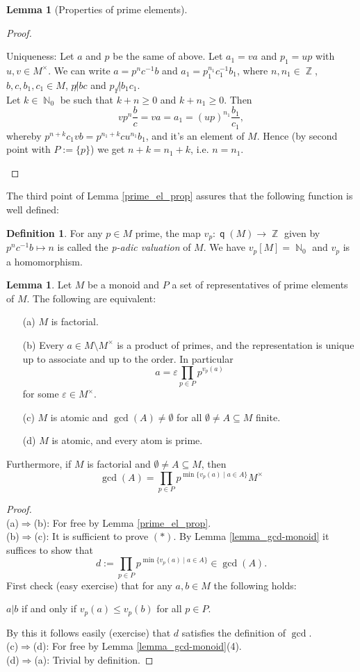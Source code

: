 \documentclass[12pt,a4paper]{report}
\theoremstyle{definition}
\newtheorem{lemma}[theorem]{Lemma}
\newtheorem{defn}[theorem]{Definition}
\theoremstyle{num.custom-title}
\DeclareMathOperator{\N}{\mathbb{N}}
\DeclareMathOperator{\Z}{\mathbb{Z}}
\DeclareMathOperator{\imp}{\Rightarrow}
\DeclareMathOperator{\sm}{\setminus}
\DeclareMathOperator{\sse}{\subseteq}
\DeclareMathOperator{\q}{\mathsf{q}}
\renewcommand{\epsilon}{\varepsilon}
\begin{document}
\begin{lemma}[Properties of prime elements]
\begin{proof}
\begin{enumerate}
Uniqueness: Let $a$ and $p$ be the same of above. Let $a_1 = va$ and $p_1=up$ with $u,v \in M^\times$. We can write $a=p^nc^{-1}b$ and $a_1 = p_1^{n_1} c_1^{-1} b_1$, where $n,n_1 \in \Z$, $b,c,b_1,c_1 \in M$, $p \not| bc$ and $p_1 \not| b_1c_1$.\\
Let $k \in \N_0$ be such that $k+n \geq 0$ and $k+n_1 \geq 0$. Then 
\[
vp^n \frac{b}{c} = va = a_1 = (up)^{n_1} \frac{b_1}{c_1},
\]
whereby $p^{n+k} c_1 v b = p^{n_1+k} c u^{n_1} b_1$, and it's an element of $M$. Hence (by second point with $P:=\{p\}$) we get $n+k=n_1+k$, i.e. $n=n_1$.
\end{enumerate}
\end{proof}
\end{lemma}

The third point of Lemma \ref{prime_el_prop} assures that the following function is well defined:

\begin{defn}
For any $p \in M$ prime, the map $v_p : \q(M) \to \Z$ given by $p^n c^{-1} b \mapsto n$ is called the \emph{p-adic valuation} of $M$. We have $v_p[M]=\N_0$ and $v_p$ is a homomorphism.
\end{defn}

\begin{lemma}\label{char_fact_monoids}
Let $M$ be a monoid and $P$ a set of representatives of prime elements of $M$. The following are equivalent:
\begin{enumerate}
\item[(a)] $M$ is factorial.
\item[(b)] Every $a \in M \sm M^\times$ is a product of primes, and the representation is unique up to associate and up to the order. In particular
\[
a = \epsilon \prod_{p \in P} p^{v_p(a)}
\]
for some $\epsilon \in M^\times$.
\item[(c)] $M$ is atomic and $\gcd(A) \neq \emptyset$ for all $\emptyset \neq A \sse M$ finite.
\item[(d)] $M$ is atomic, and every atom is prime.
\end{enumerate}
Furthermore, if $M$ is factorial and $\emptyset \neq A \sse M$, then
\[
\gcd(A) = \prod_{p \in P} p^{\min\{v_p(a) \mid a \in A\}} M^\times \tag{$*$}
\]
\begin{proof}\ \\
(a)$\imp$(b): For free by Lemma \ref{prime_el_prop}.\\
(b)$\imp$(c): It is sufficient to prove $(*)$. By Lemma \ref{lemma_gcd-monoid} it suffices to show that
\[
d := \prod_{p \in P} p^{\min\{v_p(a) \mid a \in A\}} \in \gcd(A).
\]
First check (easy exercise) that for any $a,b \in M$ the following holds:
\begin{center}
$a|b$ if and only if $v_p(a) \leq v_p(b)$ for all $p \in P$.
\end{center}
By this it follows easily (exercise) that $d$ satisfies the definition of $\gcd$.\\
(c)$\imp$(d): For free by Lemma \ref{lemma_gcd-monoid}(4).\\
(d)$\imp$(a): Trivial by definition.
\end{proof}
\end{lemma}
\end{document}
